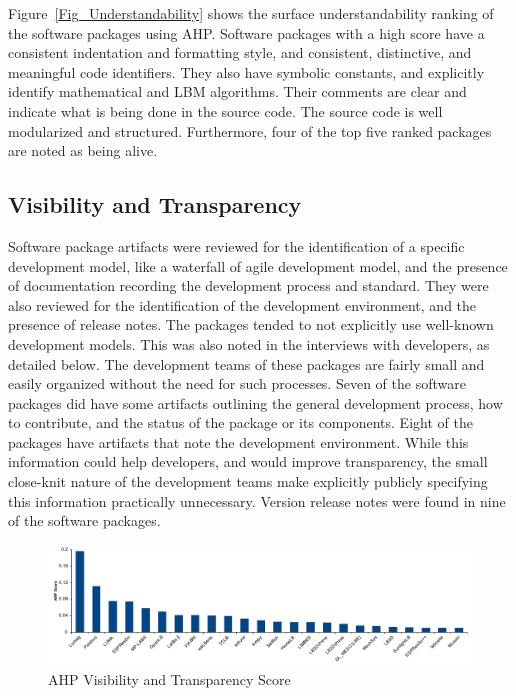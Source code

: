 \documentclass[final, 3p, times, authoryear]{elsarticle}
\begin{document}
Figure~\ref{Fig_Understandability} shows the surface understandability ranking
of the software packages using AHP. Software packages with a high score have a
consistent indentation and formatting style, and consistent, distinctive, and
meaningful code identifiers. They also have symbolic constants, and explicitly
identify mathematical and LBM algorithms. Their comments are clear and indicate
what is being done in the source code. The source code is well modularized and
structured. Furthermore, four of the top five ranked packages are noted as being
alive.

\subsection{Visibility and Transparency}

Software package artifacts were reviewed for the identification of a specific
development model, like a waterfall of agile development model, and the presence
of documentation recording the development process and standard. They were also
reviewed for the identification of the development environment, and the presence
of release notes. The packages tended to not explicitly use well-known
development models. This was also noted in the interviews with developers, as
detailed below. The development teams of these packages are fairly small and
easily organized without the need for such processes. Seven of the software
packages did have some artifacts outlining the general development process, how
to contribute, and the status of the package or its components. Eight of the
packages have artifacts that note the development environment. While this
information could help developers, and would improve transparency, the small
close-knit nature of the development teams make explicitly publicly specifying
this information practically unnecessary. Version release notes were found in
nine of the software packages.

\begin{figure}[h!]
	\begin{center}
		\includegraphics[width=1.0\textwidth]{./figures/visibilitytransparency_chart.pdf}
		\caption{AHP Visibility and Transparency Score}
		\label{Fig_VisibilityTransparency}
	\end{center}
\end{figure}
\end{document}
